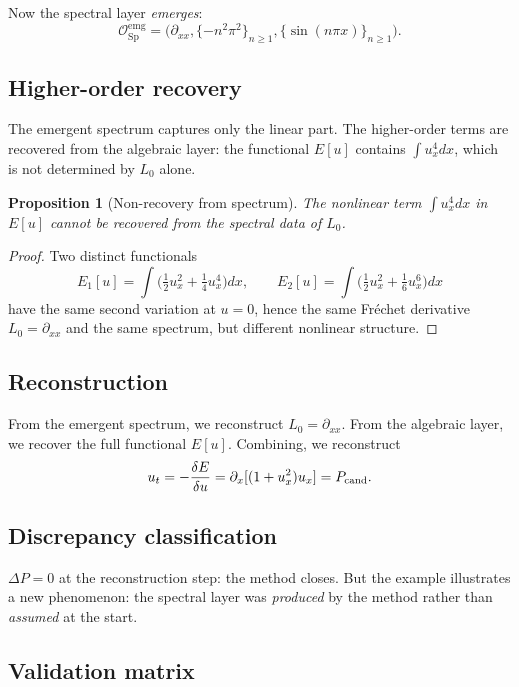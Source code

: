 \documentclass[11pt,a4paper]{article}
\theoremstyle{definition}
\theoremstyle{plain}
\newtheorem{proposition}[definition]{Proposition}
\newcommand{\Sp}{\mathrm{Sp}}
\newcommand{\Ocal}{\mathcal{O}}
\begin{document}
Now the spectral layer \emph{emerges}:
\[
  \Ocal_\Sp^{\mathrm{emg}}
  =
  \bigl( \partial_{xx}, \{-n^2 \pi^2\}_{n \geq 1},
    \{\sin(n \pi x)\}_{n \geq 1} \bigr).
\]

\subsection{Higher-order recovery}

The emergent spectrum captures only the linear part. The higher-order
terms are recovered from the algebraic layer: the functional
$E[u]$ contains $\int u_x^4 dx$, which is not determined by $L_0$
alone.

\begin{proposition}[Non-recovery from spectrum]\label{prop:non-recovery}
The nonlinear term $\int u_x^4 dx$ in $E[u]$ cannot be recovered from
the spectral data of $L_0$.
\end{proposition}

\begin{proof}
Two distinct functionals
\[
  E_1[u] = \int \bigl( \tfrac{1}{2} u_x^2 + \tfrac{1}{4} u_x^4 \bigr) dx,
  \qquad
  E_2[u] = \int \bigl( \tfrac{1}{2} u_x^2 + \tfrac{1}{6} u_x^6 \bigr) dx
\]
have the same second variation at $u = 0$, hence the same Fr\'echet
derivative $L_0 = \partial_{xx}$ and the same spectrum, but different
nonlinear structure.
\end{proof}

\subsection{Reconstruction}

From the emergent spectrum, we reconstruct $L_0 = \partial_{xx}$.
From the algebraic layer, we recover the full functional $E[u]$.
Combining, we reconstruct
\[
  u_t = -\frac{\delta E}{\delta u}
  =
  \partial_x[(1 + u_x^2) u_x]
  =
  P_{\rm cand}.
\]

\subsection{Discrepancy classification}

$\Delta P = 0$ at the reconstruction step: the method closes. But
the example illustrates a new phenomenon: the spectral layer was
\emph{produced} by the method rather than \emph{assumed} at the
start.

\subsection{Validation matrix}
\end{document}
